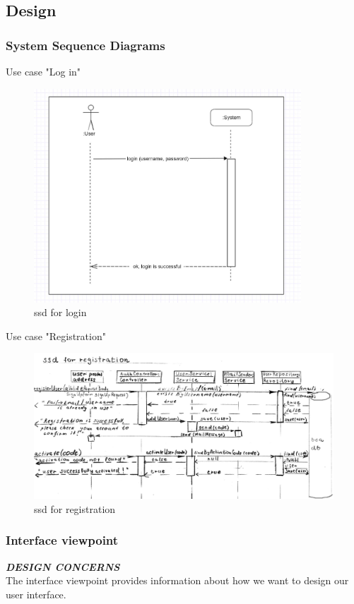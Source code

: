 \documentclass{scrartcl}
\begin{document}
\subsection{Design}
\subsubsection{System Sequence Diagrams}
 Use case "Log in"
\begin{figure}[H]
\centering
\includegraphics[width = 100mm]{ssd-login.JPG}
\caption{ssd for login}
\label{ssd for login}
\end{figure}


Use case "Registration"
\begin{figure}[H]
\centering
\includegraphics[width = 140mm]{ssd-reg.JPG}
\caption{ssd for registration}
\label{ssd for registration}
\end{figure}

\subsubsection{Interface viewpoint}
\textbf{\textit{DESIGN CONCERNS}}
\\
The interface viewpoint provides information about how we want to
design our user interface. \\
\end{document}

